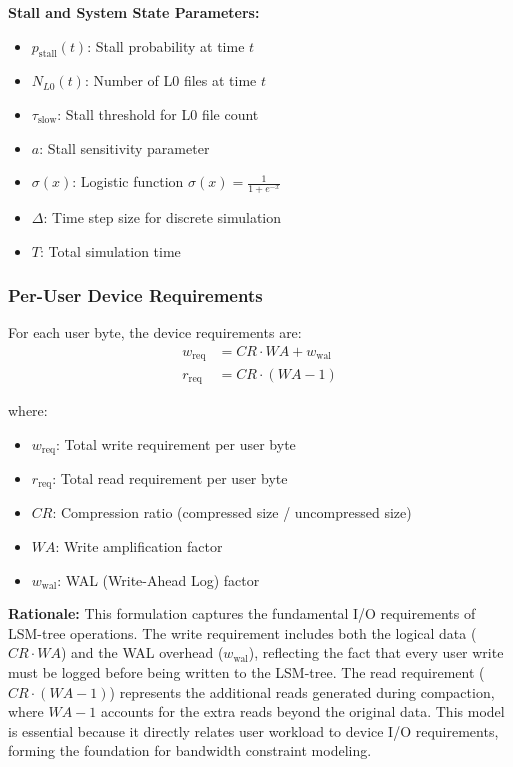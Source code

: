 \documentclass[11pt]{article}
\begin{document}
\textbf{Stall and System State Parameters:}
\begin{itemize}
    \item $p_{\text{stall}}(t)$: Stall probability at time $t$
    \item $N_{L0}(t)$: Number of L0 files at time $t$
    \item $\tau_{\text{slow}}$: Stall threshold for L0 file count
    \item $a$: Stall sensitivity parameter
    \item $\sigma(x)$: Logistic function $\sigma(x) = \frac{1}{1 + e^{-x}}$
    \item $\Delta$: Time step size for discrete simulation
    \item $T$: Total simulation time
\end{itemize}

\subsubsection{Per-User Device Requirements}
For each user byte, the device requirements are:
\begin{align}
w_{\text{req}} &= CR \cdot WA + w_{\text{wal}} \\
r_{\text{req}} &= CR \cdot (WA - 1)
\end{align}

where:
\begin{itemize}
    \item $w_{\text{req}}$: Total write requirement per user byte
    \item $r_{\text{req}}$: Total read requirement per user byte
    \item $CR$: Compression ratio (compressed size / uncompressed size)
    \item $WA$: Write amplification factor
    \item $w_{\text{wal}}$: WAL (Write-Ahead Log) factor
\end{itemize}

\textbf{Rationale:} This formulation captures the fundamental I/O requirements of LSM-tree operations. The write requirement includes both the logical data ($CR \cdot WA$) and the WAL overhead ($w_{\text{wal}}$), reflecting the fact that every user write must be logged before being written to the LSM-tree. The read requirement ($CR \cdot (WA - 1)$) represents the additional reads generated during compaction, where $WA - 1$ accounts for the extra reads beyond the original data. This model is essential because it directly relates user workload to device I/O requirements, forming the foundation for bandwidth constraint modeling.
\end{document}
